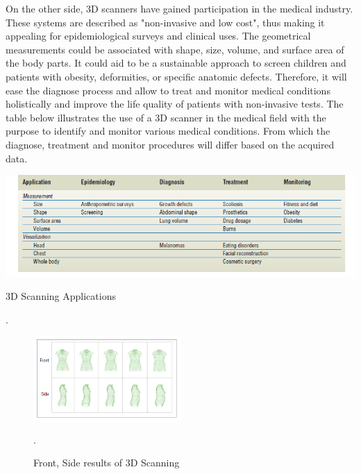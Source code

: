 \documentclass[12pt]{report}
\begin{document}
On the other side, 3D scanners have gained participation in the medical industry. These systems are described as "non-invasive and low cost", thus making it appealing for epidemiological surveys and clinical uses. 
The geometrical measurements could be associated with shape, size, volume, and surface area of the body parts. It could aid to be a sustainable approach to screen children and patients with obesity, deformities, or specific anatomic defects. 
Therefore, it will ease the diagnose process and allow to treat and monitor medical conditions holistically and improve the life quality of patients with non-invasive tests.
The table below illustrates the use of a 3D scanner in the medical field with the purpose to identify and monitor various medical conditions. 
From which the diagnose, treatment and monitor procedures will differ based on the acquired data.
\begin{table}[ht]
    \centering
    \includegraphics[width=15cm]{table1.png}
    \caption{3D Scanning Applications}\cite[]{treleaven_wells_2007}.
\end{table}

\begin{figure}[ht]
  \begin{center}
  \includegraphics[width=0.5\textwidth]{bodyMedicine.png}
  \caption{Front, Side results of 3D Scanning }\cite[]{treleaven_wells_2007}.
  \label{bodymed}
\end{center}
\end{figure}
\end{document}
